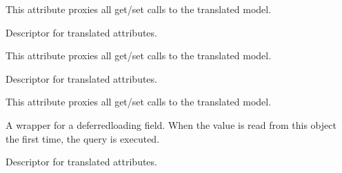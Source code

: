 \documentclass[letterpaper,10pt,english]{sphinxmanual}
\begin{document}
\begin{fulllineitems}
\begin{fulllineitems}
\sphinxAtStartPar
This attribute proxies all get/set calls to the translated model.

\end{fulllineitems}


\begin{fulllineitems}
\label{\detokenize{index:core.models.CampingInfo.arrivals_start_high}}
\pysigstartsignatures
\pysigline
{}
\pysigstopsignatures
\sphinxAtStartPar
Descriptor for translated attributes.

\sphinxAtStartPar
This attribute proxies all get/set calls to the translated model.

\end{fulllineitems}


\begin{fulllineitems}
\label{\detokenize{index:core.models.CampingInfo.departure_end}}
\pysigstartsignatures
\pysigline
{}
\pysigstopsignatures
\sphinxAtStartPar
Descriptor for translated attributes.

\sphinxAtStartPar
This attribute proxies all get/set calls to the translated model.

\end{fulllineitems}


\begin{fulllineitems}
\label{\detokenize{index:core.models.CampingInfo.id}}
\pysigstartsignatures
\pysigline
{}
\pysigstopsignatures
\sphinxAtStartPar
A wrapper for a deferred\sphinxhyphen{}loading field. When the value is read from this
object the first time, the query is executed.

\end{fulllineitems}


\begin{fulllineitems}
\label{\detokenize{index:core.models.CampingInfo.portal_end}}
\pysigstartsignatures
\pysigline
{}
\pysigstopsignatures
\sphinxAtStartPar
Descriptor for translated attributes.


\end{fulllineitems}
\end{fulllineitems}
\end{document}
